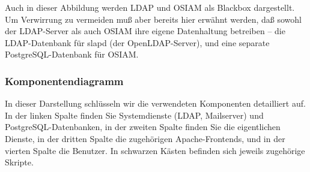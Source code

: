 Auch in dieser Abbildung werden LDAP und OSIAM als Blackbox
dargestellt. Um Verwirrung zu vermeiden muß aber bereits hier
erwähnt werden, daß sowohl der LDAP-Server als auch OSIAM ihre
eigene Datenhaltung betreiben – die LDAP-Datenbank für slapd
(der OpenLDAP-Server), und eine separate PostgreSQL-Datenbank
für OSIAM.

\subsubsection{Komponentendiagramm}\label{subsubsec:intro-overview-fine}

In dieser Darstellung schlüsseln wir die verwendeten Komponenten
detailliert auf. In der linken Spalte finden Sie Systemdienste
(LDAP, Mailserver) und PostgreSQL-Datenbanken, in der zweiten
Spalte finden Sie die eigentlichen Dienste, in der dritten Spalte
die zugehörigen Apache-Frontends, und in der vierten Spalte die
Benutzer. In schwarzen Kästen befinden sich jeweils zugehörige
Skripte.

